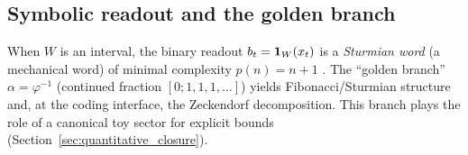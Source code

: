 \subsection{Symbolic readout and the golden branch}
\label{sec:sturmian_golden}

When $W$ is an interval, the binary readout $b_t=\mathbf{1}_W(x_t)$ is a \emph{Sturmian word} (a mechanical word) of minimal complexity $p(n)=n+1$ \cite{MorseHedlund1940,Lothaire2002}.
The ``golden branch'' $\alpha=\varphi^{-1}$ (continued fraction $[0;1,1,1,\dots]$) yields Fibonacci/Sturmian structure and, at the coding interface, the Zeckendorf decomposition. This branch plays the role of a canonical toy sector for explicit bounds (Section~\ref{sec:quantitative_closure}).


